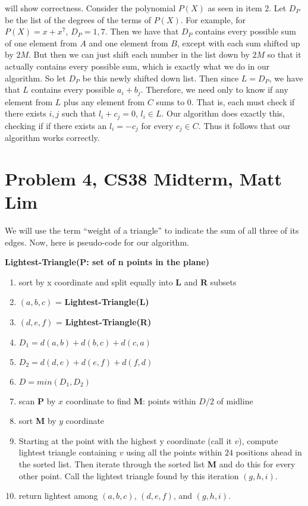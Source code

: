 \documentclass{article}
\begin{document}
\begin{description}
        will show correctness. Consider the polynomial $P(X)$ as seen in item 2.
        Let $D_P$ be the list of the degrees of the terms of $P(X)$. For
        example, for $P(X) = x + x^7$, $D_P = 1, 7$. Then we have that $D_P$
        contains every possible sum of one element from $A$ and one element from
        $B$, except with each sum shifted up by $2M$. But then we can just shift
        each number in the list down by $2M$ so that it actually contains every
        possible sum, which is exactly what we do in our algorithm. So let $D_P$
        be this newly shifted down list.
        Then since $L = D_P$, we have that $L$ contains every possible $a_i
        + b_j$. Therefore, we need only to know
        if any element from $L$ plus any element from $C$ sums to $0$. That is,
        each must check if there exists $i,j$ such that $l_i + c_j = 0$, $l_i
        \in L$. Our algorithm does exactly this, checking if if there exists an
        $l_i = -c_j$ for every $c_j \in C$. Thus it follows that our algorithm
        works correctly.

\end{description}
\newpage

\section*{Problem 4, CS38 Midterm, Matt Lim}
We will use the term ``weight of a triangle'' to indicate the sum of all three
of its edges. Now, here is pseudo-code for our algorithm.

\vspace{5mm}
\noindent \textbf{Lightest-Triangle(P: set of n points in the plane)}
\begin{enumerate}
    \item sort by x coordinate and split equally into \textbf{L} and \textbf{R} subsets
    \item $(a,b,c)$ = \textbf{Lightest-Triangle(L)}
    \item $(d,e,f)$ = \textbf{Lightest-Triangle(R)}
    \item $D_1 = d(a,b) + d(b,c) + d(c,a)$
    \item $D_2 = d(d,e) + d(e,f) + d(f,d)$
    \item $D = min(D_1, D_2)$
    \item scan \textbf{P} by $x$ coordinate to find \textbf{M}: points within $D/2$ of midline
    \item sort \textbf{M} by $y$ coordinate
    \item Starting at the point with the highest y coordinate (call it $v$),
        compute lightest triangle containing $v$ using all the points within
        $24$ positions ahead in the sorted list. Then iterate through the sorted
        list \textbf{M} and do this for every other point. Call the lightest triangle found
        by this iteration $(g,h,i)$.
    \item return lightest among $(a,b,c)$, $(d,e,f)$, and $(g,h,i)$.
\end{enumerate}
\end{document}
